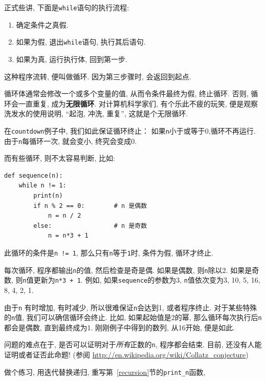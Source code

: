 \documentclass[10pt]{book}
\begin{document}
正式些讲, 下面是{\tt while}语句的执行流程:

\begin{enumerate}

\item 确定条件之真假.

\item 如果为假, 退出{\tt while}语句, 执行其后语句. 

\item 如果为真, 运行执行体, 回到第一步. 

\end{enumerate}

这种程序流转, 便叫做循环. 因为第三步骤时, 会返回到起点. 

循环体通常会修改一个或多个变量的值, 从而令条件最终为假, 终止循环. 
否则, 循环会一直重复, 成为{\bf 无限循环}. 
对计算机科学家们, 有个乐此不疲的玩笑, 
便是观察洗发水的使用说明, 
``起泡, 冲洗, 重复'',  这就是个无限循环. 

在{\tt countdown}例子中, 我们如此保证循环终止：
如果{\tt n}小于或等于0,循环不再运行. 
由于{\tt n}每循环一次, 就会变小, 终究会变成0.

而有些循环, 则不太容易判断, 比如:

\begin{verbatim}
def sequence(n):
    while n != 1:
        print(n)
        if n % 2 == 0:        # n 是偶数
            n = n / 2
        else:                 # n 是奇数
            n = n*3 + 1
\end{verbatim}
%
此循环的条件是{\tt n != 1},  那么只有{\tt n}等于{\tt 1}时, 条件为假, 循环才终止. 

每次循环, 程序都输出{\tt n}的值, 然后检查是奇是偶. 
如果是偶数, 则{\tt n}除以2. 如果是奇数, 则{\tt n}值更新为{\tt n*3 + 1}. 
例如, 如果{\tt sequence}的参数为3, {\tt n}值依次变为3, 10, 5, 16, 8, 4, 2, 1.


由于{\tt n} 有时增加, 有时减少, 所以很难保证{\tt n}会达到1, 或者程序终止. 
对于某些特殊的{\tt n}值, 我们可以确信循环会终止. 
比如, 如果起始值是2的幂, 那么循环每次执行后{\tt n}都会是偶数, 直到最终成为1.
刚刚例子中得到的数列, 从16开始, 便是如此. 

问题的难点在于, 是否可以证明对于{\em 所有}正数的{\tt n}, 程序都会结束. 
目前, 还没有人能证明或者证否此命题! 
(参阅 \url{http://en.wikipedia.org/wiki/Collatz_conjecture})

做个练习, 用迭代替换递归, 重写第~\ref{recursion}节的\verb"print_n"函数, 
\end{document}
